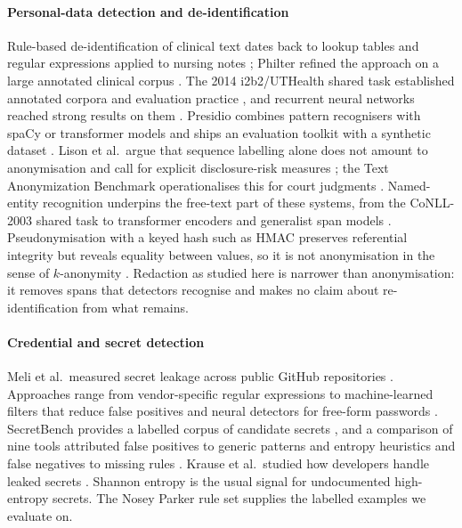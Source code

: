 \documentclass[pdflatex,sn-mathphys-num]{sn-jnl}
\theoremstyle{\ssThmStyle}
\theoremstyle{\ssDefStyle}
\begin{document}
\paragraph{Personal-data detection and de-identification}
Rule-based de-identification of clinical text dates back to lookup tables and regular expressions applied to nursing notes \cite{neamatullah2008deid}; Philter refined the approach on a large annotated clinical corpus \cite{norgeot2020philter}. The 2014 i2b2/UTHealth shared task established annotated corpora and evaluation practice \cite{stubbs2015annotating}, and recurrent neural networks reached strong results on them \cite{dernoncourt2017deid}. Presidio \cite{presidio} combines pattern recognisers with spaCy or transformer models and ships an evaluation toolkit with a synthetic dataset \cite{presidioresearch}. Lison et al.\ argue that sequence labelling alone does not amount to anonymisation and call for explicit disclosure-risk measures \cite{lison2021anonymisation}; the Text Anonymization Benchmark operationalises this for court judgments \cite{pilan2022tab}. Named-entity recognition underpins the free-text part of these systems, from the CoNLL-2003 shared task \cite{tjongkimsang2003conll} to transformer encoders \cite{devlin2019bert,sanh2019distilbert} and generalist span models \cite{zaratiana2024gliner}. Pseudonymisation with a keyed hash such as HMAC \cite{rfc2104} preserves referential integrity but reveals equality between values, so it is not anonymisation in the sense of $k$-anonymity \cite{sweeney2002kanonymity}. Redaction as studied here is narrower than anonymisation: it removes spans that detectors recognise and makes no claim about re-identification from what remains.

\paragraph{Credential and secret detection}
Meli et al.\ measured secret leakage across public GitHub repositories \cite{meli2019git}. Approaches range from vendor-specific regular expressions \cite{sinha2015secretkey} to machine-learned filters that reduce false positives \cite{saha2020secrets} and neural detectors for free-form passwords \cite{feng2022passfinder}. SecretBench provides a labelled corpus of candidate secrets \cite{basak2023secretbench}, and a comparison of nine tools attributed false positives to generic patterns and entropy heuristics and false negatives to missing rules \cite{basak2023comparative}. Krause et al.\ studied how developers handle leaked secrets \cite{krause2023pushed}. Shannon entropy \cite{shannon1948} is the usual signal for undocumented high-entropy secrets. The Nosey Parker rule set \cite{noseyparker} supplies the labelled examples we evaluate on.
\end{document}
